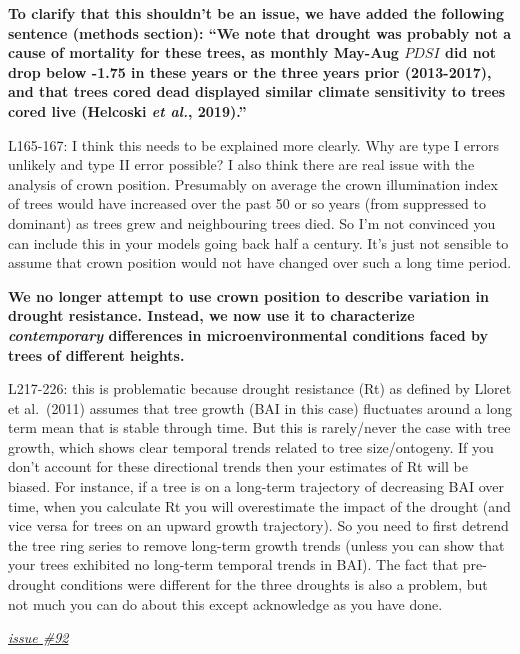 \documentclass[
]{article}
\begin{document}
\textbf{To clarify that this shouldn't be an issue, we have added the
following sentence (methods section): ``We note that drought was
probably not a cause of mortality for these trees, as monthly May-Aug
\(PDSI\) did not drop below -1.75 in these years or the three years
prior (2013-2017), and that trees cored dead displayed similar climate
sensitivity to trees cored live (Helcoski \emph{et al.}, 2019).''}

L165-167: I think this needs to be explained more clearly. Why are type
I errors unlikely and type II error possible? I also think there are
real issue with the analysis of crown position. Presumably on average
the crown illumination index of trees would have increased over the past
50 or so years (from suppressed to dominant) as trees grew and
neighbouring trees died. So I'm not convinced you can include this in
your models going back half a century. It's just not sensible to assume
that crown position would not have changed over such a long time period.

\textbf{We no longer attempt to use crown position to describe variation
in drought resistance. Instead, we now use it to characterize
\emph{contemporary} differences in microenvironmental conditions faced
by trees of different heights.}

L217-226: this is problematic because drought resistance (Rt) as defined
by Lloret et al.~(2011) assumes that tree growth (BAI in this case)
fluctuates around a long term mean that is stable through time. But this
is rarely/never the case with tree growth, which shows clear temporal
trends related to tree size/ontogeny. If you don't account for these
directional trends then your estimates of Rt will be biased. For
instance, if a tree is on a long-term trajectory of decreasing BAI over
time, when you calculate Rt you will overestimate the impact of the
drought (and vice versa for trees on an upward growth trajectory). So
you need to first detrend the tree ring series to remove long-term
growth trends (unless you can show that your trees exhibited no
long-term temporal trends in BAI). The fact that pre-drought conditions
were different for the three droughts is also a problem, but not much
you can do about this except acknowledge as you have done.

\href{https://github.com/SCBI-ForestGEO/McGregor_climate-sensitivity-variation/issues/92}{\emph{issue
\#92}}
\end{document}
